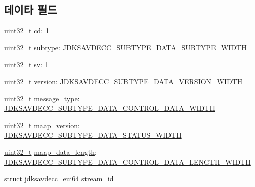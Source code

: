 \subsection*{데이타 필드}
\begin{DoxyCompactItemize}
\item 
\hyperlink{parse_8c_a6eb1e68cc391dd753bc8ce896dbb8315}{uint32\+\_\+t} \hyperlink{structjdksavdecc__maap__common__control__header_a9bdcd90bda4a8763700a1d59c27a6a26}{cd}\+: 1
\item 
\hyperlink{parse_8c_a6eb1e68cc391dd753bc8ce896dbb8315}{uint32\+\_\+t} \hyperlink{structjdksavdecc__maap__common__control__header_aed06f4a516930ca81d204d53c61a1ef3}{subtype}\+: \hyperlink{group__jdksavdecc__subtype__data_ga624227fd72dbec4cbec4f6436024fad8}{J\+D\+K\+S\+A\+V\+D\+E\+C\+C\+\_\+\+S\+U\+B\+T\+Y\+P\+E\+\_\+\+D\+A\+T\+A\+\_\+\+S\+U\+B\+T\+Y\+P\+E\+\_\+\+W\+I\+D\+TH}
\item 
\hyperlink{parse_8c_a6eb1e68cc391dd753bc8ce896dbb8315}{uint32\+\_\+t} \hyperlink{structjdksavdecc__maap__common__control__header_a9eeedef9f348218323834a3cf44d64c4}{sv}\+: 1
\item 
\hyperlink{parse_8c_a6eb1e68cc391dd753bc8ce896dbb8315}{uint32\+\_\+t} \hyperlink{structjdksavdecc__maap__common__control__header_acd99bb05ca015e7d74448acb1deba7ca}{version}\+: \hyperlink{group__jdksavdecc__subtype__data_ga97591e640a971dc293e1416455fb9ee3}{J\+D\+K\+S\+A\+V\+D\+E\+C\+C\+\_\+\+S\+U\+B\+T\+Y\+P\+E\+\_\+\+D\+A\+T\+A\+\_\+\+V\+E\+R\+S\+I\+O\+N\+\_\+\+W\+I\+D\+TH}
\item 
\hyperlink{parse_8c_a6eb1e68cc391dd753bc8ce896dbb8315}{uint32\+\_\+t} \hyperlink{structjdksavdecc__maap__common__control__header_a84c56f5f8c75e0b021f73b2882280040}{message\+\_\+type}\+: \hyperlink{group__jdksavdecc__subtype__data_ga032f46118325ac56a0505490dff24963}{J\+D\+K\+S\+A\+V\+D\+E\+C\+C\+\_\+\+S\+U\+B\+T\+Y\+P\+E\+\_\+\+D\+A\+T\+A\+\_\+\+C\+O\+N\+T\+R\+O\+L\+\_\+\+D\+A\+T\+A\+\_\+\+W\+I\+D\+TH}
\item 
\hyperlink{parse_8c_a6eb1e68cc391dd753bc8ce896dbb8315}{uint32\+\_\+t} \hyperlink{structjdksavdecc__maap__common__control__header_aac41d9b7e9e68c95fb5ff264748b98d6}{maap\+\_\+version}\+: \hyperlink{group__jdksavdecc__subtype__data_ga38a112978fe469b74b7541de23733f50}{J\+D\+K\+S\+A\+V\+D\+E\+C\+C\+\_\+\+S\+U\+B\+T\+Y\+P\+E\+\_\+\+D\+A\+T\+A\+\_\+\+S\+T\+A\+T\+U\+S\+\_\+\+W\+I\+D\+TH}
\item 
\hyperlink{parse_8c_a6eb1e68cc391dd753bc8ce896dbb8315}{uint32\+\_\+t} \hyperlink{structjdksavdecc__maap__common__control__header_aa11ab4359d526b8abf1c868bd14501cb}{maap\+\_\+data\+\_\+length}\+: \hyperlink{group__jdksavdecc__subtype__data_ga0bd033997c197fad16adfd5e24708935}{J\+D\+K\+S\+A\+V\+D\+E\+C\+C\+\_\+\+S\+U\+B\+T\+Y\+P\+E\+\_\+\+D\+A\+T\+A\+\_\+\+C\+O\+N\+T\+R\+O\+L\+\_\+\+D\+A\+T\+A\+\_\+\+L\+E\+N\+G\+T\+H\+\_\+\+W\+I\+D\+TH}
\item 
struct \hyperlink{structjdksavdecc__eui64}{jdksavdecc\+\_\+eui64} \hyperlink{structjdksavdecc__maap__common__control__header_af4c017686a11885d1d514c21bcde8160}{stream\+\_\+id}
\end{DoxyCompactItemize}


